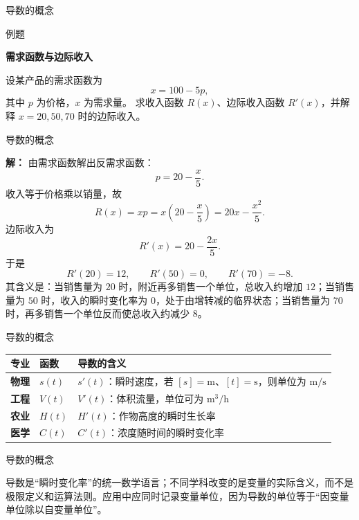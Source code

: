 \documentclass[aspectratio=169,10pt,fontset=fandol]{ctexbeamer}
\begin{document}
\begin{frame}[t,fragile]{导数的概念}
\normalsize
\begin{block}{例题}
{\normalsize
\textbf{需求函数与边际收入}\par

设某产品的需求函数为
\[
x=100-5p,
\]
其中 $p$ 为价格，$x$ 为需求量。 求收入函数 $R(x)$、边际收入函数 $R'(x)$，并解释 $x=20,50,70$ 时的边际收入。

}
\end{block}
\end{frame}
\begin{frame}[t,fragile]{导数的概念}
\footnotesize
{\footnotesize
\textbf{解：}
由需求函数解出反需求函数：
\[
p=20-\frac{x}{5}.
\]
收入等于价格乘以销量，故
\[
R(x)=xp=x\left(20-\frac{x}{5}\right)=20x-\frac{x^2}{5}.
\]
边际收入为
\[
R'(x)=20-\frac{2x}{5}.
\]
于是
\[
R'(20)=12,\qquad R'(50)=0,\qquad R'(70)=-8.
\]
其含义是：当销售量为 $20$ 时，附近再多销售一个单位，总收入约增加 $12$；当销售量为 $50$ 时，收入的瞬时变化率为 $0$，处于由增转减的临界状态；当销售量为 $70$ 时，再多销售一个单位反而使总收入约减少 $8$。

}
\end{frame}
\begin{frame}[t,fragile]{导数的概念}
\normalsize
{\normalsize
\begin{center}
\small
\begin{tabularx}{\textwidth}{>{\bfseries}p{1.4cm} p{2.0cm} X}
\toprule
专业 & 函数 & 导数的含义 \\
\midrule
物理 & $s(t)$ & $s'(t)$：瞬时速度，若 $[s]=\mathrm m$、$[t]=\mathrm s$，则单位为 $\mathrm{m/s}$ \\
工程 & $V(t)$ & $V'(t)$：体积流量，单位可为 $\mathrm{m^3/h}$ \\
农业 & $H(t)$ & $H'(t)$：作物高度的瞬时生长率 \\
医学 & $C(t)$ & $C'(t)$：浓度随时间的瞬时变化率 \\
\bottomrule
\end{tabularx}
\end{center}
}
\end{frame}
\begin{frame}[t,fragile]{导数的概念}
\normalsize
{\normalsize
导数是“瞬时变化率”的统一数学语言；不同学科改变的是变量的实际含义，而不是极限定义和运算法则。应用中应同时记录变量单位，因为导数的单位等于“因变量单位除以自变量单位”。


}
\end{frame}
\end{document}
